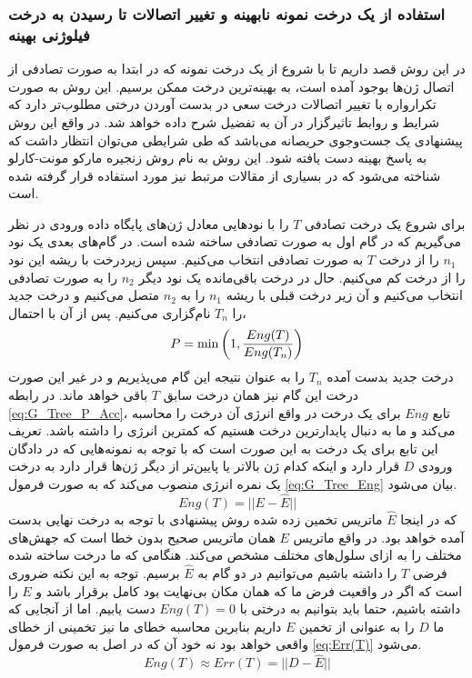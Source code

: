 \subsubsection{استفاده از یک درخت نمونه نابهینه و تغییر اتصالات تا رسیدن به درخت فیلوژنی بهینه}
در این روش قصد داریم تا با شروع از یک درخت نمونه که در ابتدا به صورت تصادفی از اتصال ژن‌ها بوجود آمده است، به بهینه‌ترین درخت ممکن برسیم. این روش به صورت تکرارواره با تغییر اتصالات درخت سعی در بدست آوردن درختی مطلوب‌تر دارد که شرایط و روابط تاثیرگزار در آن به تفضیل شرح داده خواهد شد. در واقع این روش پیشنهادی یک جست‌وجوی حریصانه می‌باشد که طی شرایطی می‌توان انتظار داشت که به پاسخ بهینه دست یافته شود. این روش به نام روش زنجیره مارکو مونت-کارلو شناخته می‌شود که در بسیاری از مقالات مرتبط نیز مورد استفاده قرار گرفته شده است.

برای شروع یک درخت تصادفی $T$ را با نودهایی معادل ژن‌های پایگاه داده ورودی در نظر می‌گیریم که در گام اول به صورت تصادفی ساخته شده است. در گام‌های بعدی یک نود $n_1$ را از درخت $T$ به صورت تصادفی انتخاب می‌کنیم. سپس زیردرخت با ریشه این نود را از درخت کم می‌کنیم. حال در درخت باقی‌مانده یک نود دیگر $n_2$ را به صورت تصادفی انتخاب می‌کنیم و آن زیر درخت قبلی با ریشه $n_1$ را به $n_2$ متصل می‌کنیم و درخت جدید را $T_n$ نام‌گزاری می‌کنیم. پس از آن با احتمال،
\begin{equation}
	P=\min\left(1, {Eng(T)\over Eng(T_n)}\right)
	\label{eq:G_Tree_P_Acc}
\end{equation}
درخت جدید بدست آمده $T_n$ را به عنوان نتیجه این گام می‌پذیریم و در غیر این صورت درخت این گام نیز همان درخت سابق $T$ باقی خواهد ماند. در رابطه \ref{eq:G_Tree_P_Acc}، تابع $Eng$ برای یک درخت در واقع انرژی آن درخت را محاسبه ‌می‌کند و ما به دنبال پایدارترین درخت هستیم که کمترین انرژی را داشته باشد. تعریف این تابع برای یک درخت به این صورت است که با توجه به نمونه‌هایی که در دادگان ورودی $D$ قرار دارد و اینکه کدام ژن بالاتر یا پایین‌تر از دیگر ژن‌ها قرار دارد به درخت یک نمره انرژی منصوب می‌کند که به صورت فرمول \ref*{eq:G_Tree_Eng} بیان می‌شود.
\begin{equation}
	Eng(T) = ||E - \hat{E}||
	\label{eq:G_Tree_Eng}
\end{equation}
که در اینجا $\hat{E}$ ماتریس تخمین زده شده روش پیشنهادی با توجه به درخت نهایی بدست آمده خواهد بود. در واقع ماتریس $E$ همان ماتریس صحیح بدون خطا است که جهش‌های مختلف را به ازای سلول‌های مختلف مشخص می‌کند. هنگامی که ما درخت ساخته شده فرضی $T$ را داشته باشیم می‌توانیم در دو گام به $\hat{E}$ برسیم. توجه به این نکته ضروری است که اگر در واقعیت فرض ما که همان مکان بی‌نهایت بود کامل برقرار باشد و $E$ را داشته باشیم، حتما باید بتوانیم به درختی با $Eng(T)=0$ دست یابیم. اما از آنجایی که ما $D$ را به عنوانی از تخمین $E$ داریم بنابرین محاسبه خطای ما نیز تخمینی از خطای واقعی خواهد بود نه خود آن که در اصل به صورت فرمول \ref{eq:Err(T)} می‌شود.
\begin{equation}
	Eng(T) \approx Err(T) = ||D-\hat{E}||
	\label{eq:Err(T)}
\end{equation}

